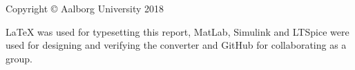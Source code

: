 \thispagestyle{empty}
{\small
\strut\vfill %
\noindent Copyright \copyright{} Aalborg University 2018\par
\vspace{0.2cm}
\noindent \LaTeX \: was used for typesetting this report,
MatLab, Simulink and LTSpice were used for designing and verifying the converter and
GitHub \cite{GitHub} for collaborating as a group.
}
\clearpage